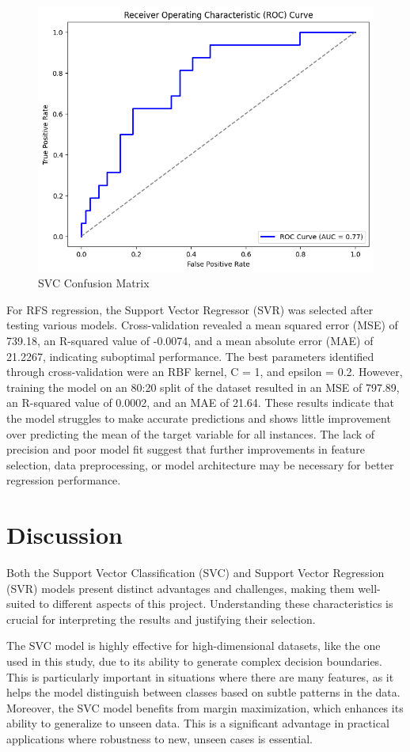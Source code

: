\documentclass{article}
\begin{document}
\begin{figure}
  \centering
  \includegraphics[width=0.75\linewidth]{roc.png}
  \caption{SVC Confusion Matrix}
  \label{fig:f2}
\end{figure}

For RFS regression, the Support Vector Regressor (SVR) was selected after testing various models. Cross-validation revealed a mean squared error (MSE) of 739.18, an R-squared value of -0.0074, and a mean absolute error (MAE) of 21.2267, indicating suboptimal performance. The best parameters identified through cross-validation were an RBF kernel, C = 1, and epsilon = 0.2. However, training the model on an 80:20 split of the dataset resulted in an MSE of 797.89, an R-squared value of 0.0002, and an MAE of 21.64. These results indicate that the model struggles to make accurate predictions and shows little improvement over predicting the mean of the target variable for all instances. The lack of precision and poor model fit suggest that further improvements in feature selection, data preprocessing, or model architecture may be necessary for better regression performance.

\section{Discussion}

Both the Support Vector Classification (SVC) and Support Vector Regression (SVR) models present distinct advantages and challenges, making them well-suited to different aspects of this project. Understanding these characteristics is crucial for interpreting the results and justifying their selection.

The SVC model is highly effective for high-dimensional datasets, like the one used in this study, due to its ability to generate complex decision boundaries. This is particularly important in situations where there are many features, as it helps the model distinguish between classes based on subtle patterns in the data. Moreover, the SVC model benefits from margin maximization, which enhances its ability to generalize to unseen data. This is a significant advantage in practical applications where robustness to new, unseen cases is essential.
\end{document}
